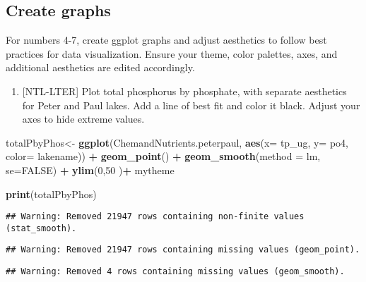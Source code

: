 \documentclass[]{article}
\newenvironment{Shaded}{\begin{snugshade}}{\end{snugshade}}
\newcommand{\DataTypeTok}[1]{\textcolor[rgb]{0.13,0.29,0.53}{#1}}
\newcommand{\DecValTok}[1]{\textcolor[rgb]{0.00,0.00,0.81}{#1}}
\newcommand{\KeywordTok}[1]{\textcolor[rgb]{0.13,0.29,0.53}{\textbf{#1}}}
\newcommand{\NormalTok}[1]{#1}
\newcommand{\OperatorTok}[1]{\textcolor[rgb]{0.81,0.36,0.00}{\textbf{#1}}}
\newcommand{\OtherTok}[1]{\textcolor[rgb]{0.56,0.35,0.01}{#1}}
\newcommand{\StringTok}[1]{\textcolor[rgb]{0.31,0.60,0.02}{#1}}
\providecommand{\tightlist}{%
  \setlength{\itemsep}{0pt}\setlength{\parskip}{0pt}}
\begin{document}
\hypertarget{create-graphs}{%
\subsection{Create graphs}\label{create-graphs}}

For numbers 4-7, create ggplot graphs and adjust aesthetics to follow
best practices for data visualization. Ensure your theme, color
palettes, axes, and additional aesthetics are edited accordingly.

\begin{enumerate}
\def\labelenumi{\arabic{enumi}.}
\setcounter{enumi}{3}
\tightlist
\item
  {[}NTL-LTER{]} Plot total phosphorus by phosphate, with separate
  aesthetics for Peter and Paul lakes. Add a line of best fit and color
  it black. Adjust your axes to hide extreme values.
\end{enumerate}

\begin{Shaded}
\begin{Highlighting}[]
\NormalTok{totalPbyPhos<-}
\StringTok{  }\KeywordTok{ggplot}\NormalTok{(ChemandNutrients.peterpaul, }
         \KeywordTok{aes}\NormalTok{(}\DataTypeTok{x=}\NormalTok{ tp_ug, }\DataTypeTok{y=}\NormalTok{ po4, }\DataTypeTok{color=}\NormalTok{ lakename)) }\OperatorTok{+}
\StringTok{  }\KeywordTok{geom_point}\NormalTok{() }\OperatorTok{+}
\StringTok{  }\KeywordTok{geom_smooth}\NormalTok{(}\DataTypeTok{method =}\NormalTok{ lm, }\DataTypeTok{se=}\OtherTok{FALSE}\NormalTok{) }\OperatorTok{+}
\StringTok{  }\KeywordTok{ylim}\NormalTok{(}\DecValTok{0}\NormalTok{,}\DecValTok{50}\NormalTok{ )}\OperatorTok{+}
\StringTok{  }\NormalTok{mytheme}

\KeywordTok{print}\NormalTok{(totalPbyPhos)}
\end{Highlighting}
\end{Shaded}

\begin{verbatim}
## Warning: Removed 21947 rows containing non-finite values (stat_smooth).
\end{verbatim}

\begin{verbatim}
## Warning: Removed 21947 rows containing missing values (geom_point).
\end{verbatim}

\begin{verbatim}
## Warning: Removed 4 rows containing missing values (geom_smooth).
\end{verbatim}
\end{document}

